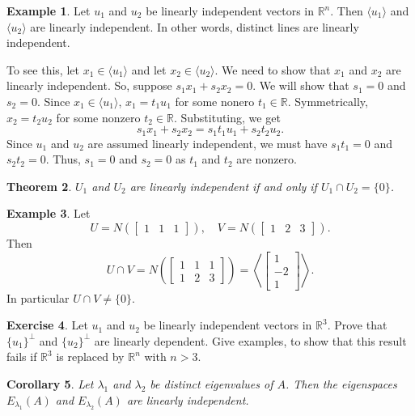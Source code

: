 \documentclass[fullpage]{amsart}
\newcommand{\RR}{\mathbb{R}}
\newtheorem{theorem}{Theorem}[section]
\newtheorem{corollary}[theorem]{Corollary}
\theoremstyle{definition}
\newtheorem{example}[theorem]{Example}
\newtheorem{exercise}[theorem]{Exercise}
\begin{document}
\begin{example}
  Let $u_1$ and $u_2$ be linearly independent vectors in $\RR^n$.
  Then $\langle u_1\rangle$ and $\langle u_2\rangle$ are linearly independent.
  In other words, distinct lines are linearly independent.

  To see this, let $x_1\in \langle u_1\rangle$ and let $x_2\in \langle u_2\rangle$.
  We need to show that $x_1$ and $x_2$ are linearly independent.
  So, suppose $s_1x_1+s_2x_2=0$. We will show that $s_1=0$ and $s_2=0$.
  Since $x_1\in \langle u_1\rangle$, $x_1=t_1u_1$ for some nonero $t_1\in\RR$.
  Symmetrically, $x_2 = t_2u_2$ for some nonzero $t_2\in \RR$. Substituting, we get
  $$
  s_1x_1 + s_2x_2 = s_1t_1u_1 + s_2t_2u_2.
  $$
  Since $u_1$ and $u_2$ are assumed linearly independent, we must have $s_1t_1=0$ and $s_2t_2=0$.
  Thus, $s_1=0$ and $s_2=0$ as $t_1$ and $t_2$ are nonzero.
\end{example}

\begin{theorem}
  $U_1$ and $U_2$ are linearly independent if and only if $U_1\cap U_2 = \{0\}$.
\end{theorem}

\begin{example}
Let 
$$U = N\left(\begin{bmatrix}1&1&1\end{bmatrix}\right),\quad
V=N\left(\begin{bmatrix}1&2&3\end{bmatrix}\right).$$
  Then
  $$
  U\cap V = N\left(
    \begin{bmatrix}1&1&1\\1&2&3\end{bmatrix}
  \right) = 
\left\langle\begin{bmatrix}1\\-2\\1\end{bmatrix}\right\rangle.
  $$
  In particular $U\cap V\neq \{0\}$.
\end{example}

\begin{exercise}
  Let $u_1$ and $u_2$ be linearly independent vectors in $\RR^3$.
  Prove that $\{u_1\}^\perp$ and $\{u_2\}^\perp$ are linearly dependent.
  Give examples, to show that this result fails if $\RR^3$ is replaced by $\RR^n$ with $n>3$.
\end{exercise}

 \begin{corollary}
  Let $\lambda_1$ and $\lambda_2$ be distinct eigenvalues of $A$. Then the eigenspaces $E_{\lambda_1}(A)$ and $E_{\lambda_2}(A)$ are linearly independent.
 \end{corollary}
\end{document}
